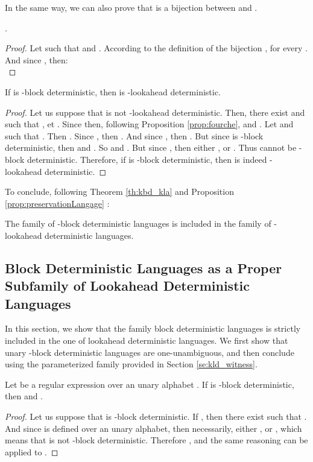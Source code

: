 \documentclass{llncs}
\begin{document}
In the same way, we can also prove that  is a bijection between  and .

\begin{proposition}\label{prop:preservationLangage}
	.
\end{proposition}
\begin{proof}
	Let  such that  and .
	According to the definition of the bijection , for every .
	And since , then:\\
	

\end{proof}

\begin{theorem}\label{th:kbd_kla}
	If  is -block deterministic, then  is -lookahead deterministic.
\end{theorem}
\begin{proof}
	Let us suppose that  is not -lookahead deterministic.
	Then, there exist  and  such that ,  et .
	Since  then, following Proposition \ref{prop:fourche},  and .
	Let  and  such that .
	Then .
	Since , then .
	And since , then .
	But since  is -block deterministic, then  and .
	So  and .
	But since , then either , or .
	Thus  cannot be -block deterministic.
	Therefore, if  is -block deterministic, then  is indeed -lookahead deterministic.
\end{proof}

To conclude, following Theorem \ref{th:kbd_kla} and Proposition \ref{prop:preservationLangage} :

\begin{theorem}
	The family of -block deterministic languages is included in the family of -lookahead deterministic languages.
\end{theorem}



\subsection{Block Deterministic Languages as a Proper Subfamily of Lookahead Deterministic Languages}

	In this section, we show that the family block deterministic languages is strictly included in the one of lookahead deterministic languages.
	We first show that unary -block deterministic languages are one-unambiguous, and then conclude using the parameterized family provided in Section \ref{se:kld_witness}.

\begin{proposition}
	Let  be a regular expression over an unary alphabet .
	If  is -block deterministic, then  and .
\end{proposition}
\begin{proof}
	Let us suppose that  is -block deterministic.
	If , then there exist  such that .
	And since  is defined over an unary alphabet, then necessarily, either , or , which means that  is not -block deterministic.
	Therefore , and the same reasoning can be applied to .
\end{proof}
\end{document}
